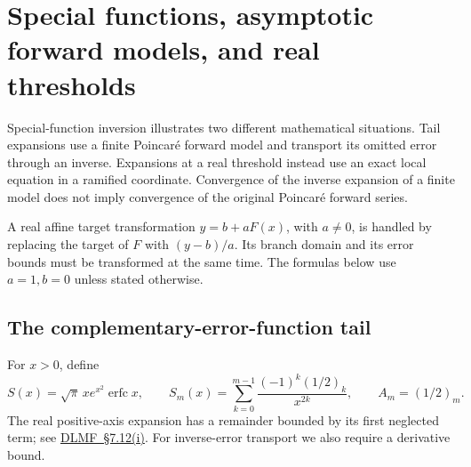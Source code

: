 \section{Special functions, asymptotic forward models, and real thresholds}
\label{sec:special-function-adapters}

Special-function inversion illustrates two different mathematical
situations. Tail expansions use a finite Poincar\'e forward model and
transport its omitted error through an inverse. Expansions at a real
threshold instead use an exact local equation in a ramified coordinate.
Convergence of the inverse expansion of a finite model does not imply
convergence of the original Poincar\'e forward series.

A real affine target transformation $y=b+aF(x)$, with $a\ne0$, is handled
by replacing the target of $F$ with $(y-b)/a$. Its branch domain and its
error bounds must be transformed at the same time. The formulas below use
$a=1,b=0$ unless stated otherwise.

\subsection{The complementary-error-function tail}

For $x>0$, define
\begin{equation}
 S(x)=\sqrt\pi\,x e^{x^2}\operatorname{erfc}x,
 \qquad
 S_m(x)=\sum_{k=0}^{m-1}\frac{(-1)^k(1/2)_k}{x^{2k}},
 \qquad A_m=(1/2)_m.
 \label{eq:erfc-normalized-tail}
\end{equation}
The real positive-axis expansion has a remainder bounded by its first
neglected term; see
\href{https://dlmf.nist.gov/7.12.i}{DLMF~\S7.12(i)}.
For inverse-error transport we also require a derivative bound.

